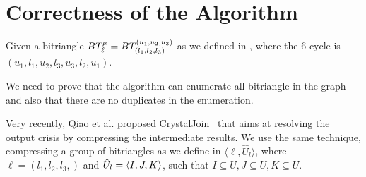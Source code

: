 \clearpage
\section{Correctness of the Algorithm}
Given a bitriangle  $BT_{\ell}^{\mu} = BT_{(l_1, l_2,l_3)}^{(u_1, u_2, u_3)}$ as we defined in , where the 6-cycle is $(u_1,l_1,u_2,l_3,u_3,l_2,u_1)$.


We need to prove that the algorithm can enumerate all bitriangle in the graph and also that there are no duplicates in the enumeration.

Very recently, Qiao et al. proposed CrystalJoin~\cite{Lai} that aims at resolving the output crisis by compressing the intermediate results.
We use the same technique, compressing a group of bitriangles as we define in  $\langle \ell, \hat{U}_l\rangle$, where $\ell = (l_1,l_2,l_3,)$ and $\hat{U}_l= \left\langle I, J, K\right\rangle$, such that $I \subseteq U, J \subseteq U, K \subseteq U$.
 

